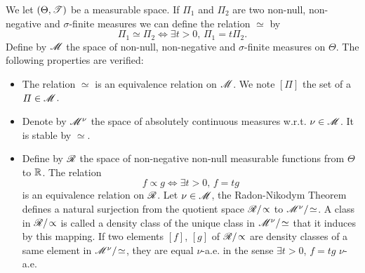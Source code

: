 We let $(\Theta,\mathscr{T})$ be a measurable space. If $\varPi_1$ and $\varPi _2$ are two non-null, non-negative and $\sigma$-finite  measures we can define the relation $\simeq$ by
    \begin{equation}
        \varPi_1\simeq\varPi_2\Longleftrightarrow\exists t>0,\,\varPi_1= t\varPi_2.
    \end{equation}
Define by $\mathscr{M}$ the space of non-null, non-negative and $\sigma$-finite measures on $\Theta$. The following properties are verified:
    \begin{itemize}
        \item The relation $\simeq$ is an equivalence relation on $\mathscr{M}$. We note $[\varPi]$ the set of a $\varPi\in\mathscr{M}$.
        \item Denote by $\mathscr{M}^\nu$ the space of absolutely continuous measures w.r.t. $\nu\in\mathscr{M}$. It is stable by $\simeq$.
        \item Define by $\mathscr{R}$ the space of non-negative non-null measurable functions from $\Theta$ to $\mathbb{R}$. The relation%
            \begin{equation}
                f\propto g \Longleftrightarrow\exists t>0,\,f= t g%
            \end{equation}
        is an equivalence relation on $\mathscr{R}$. %
        Let $\nu\in\mathscr{M}$, the Radon-Nikodym Theorem defines a natural surjection from the quotient space $\mathscr{R}/\!\propto$ to $\mathscr{M}^\nu/\!\simeq$. 
        A class in $\mathscr{R}/\!\propto$ is called a density class of the unique class in $\mathscr{M}^\nu/\!\simeq$ that it induces by this mapping. If two elements $[f]$, $[g]$ of $\mathscr{R}/\!\propto$ are density classes of a same element in $\mathscr{M}^\nu/\!\simeq$, they are equal $\nu$-a.e. in the sense $\exists t>0$, $f= t g$ $\nu$-a.e.
    \end{itemize}

